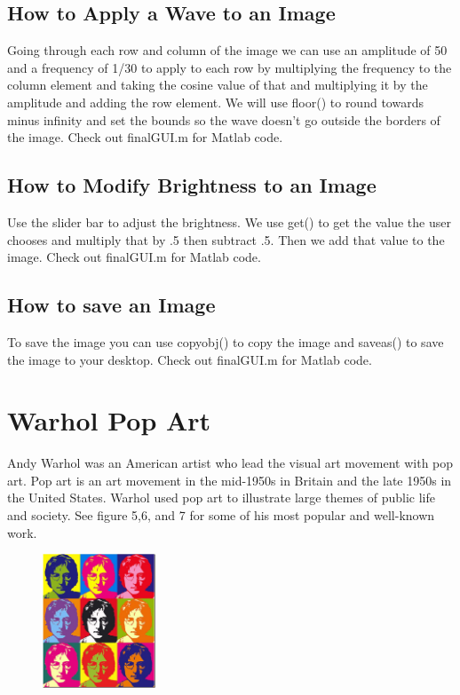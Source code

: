 \documentclass[a4paper]{article}
\begin{document}
\subsection{How to Apply a Wave to an Image}
Going through each row and column of the image we can use an amplitude of 50 and a frequency of 1/30 to apply to each row by multiplying the frequency to the column element and taking the cosine value of that and multiplying it by the amplitude and adding the row element. We will use floor() to round towards minus infinity and set the bounds so the wave doesn't go outside the borders of the image. Check out finalGUI.m for Matlab code.

\subsection{How to Modify Brightness to an Image}
Use the slider bar to adjust the brightness. We use get() to get the value the user chooses and multiply that by .5 then subtract .5. Then we add that value to the image.  Check out finalGUI.m for Matlab code.


\subsection{How to save an Image}
To save the image you can use copyobj() to copy the image and saveas() to save the image to your desktop. Check out finalGUI.m for Matlab code.

\section{Warhol Pop Art}
Andy Warhol was an American artist who lead the visual art movement with pop art. Pop art is an art movement in the mid-1950s in Britain and the late 1950s in the United States. Warhol used pop art to illustrate large themes of public life and society. See figure 5,6, and 7 for some of his most popular and well-known work.

\begin{figure}
\centering
\includegraphics[width=0.3\textwidth]{ex1.jpg}
\caption{\label{fig:Warhol example 1}}
\end{figure}
\end{document}
